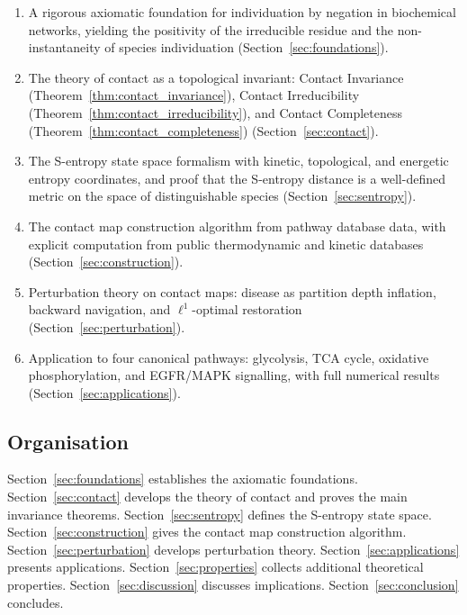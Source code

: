 \documentclass[11pt,twocolumn]{article}
\theoremstyle{plain}
\theoremstyle{definition}
\begin{document}
\begin{enumerate}[label=(\roman*)]
\item A rigorous axiomatic foundation for individuation by negation in
  biochemical networks, yielding the positivity of the irreducible residue
  and the non-instantaneity of species individuation
  (Section~\ref{sec:foundations}).

\item The theory of contact as a topological invariant: Contact Invariance
  (Theorem~\ref{thm:contact_invariance}), Contact Irreducibility
  (Theorem~\ref{thm:contact_irreducibility}), and Contact Completeness
  (Theorem~\ref{thm:contact_completeness}) (Section~\ref{sec:contact}).

\item The S-entropy state space formalism with kinetic, topological, and
  energetic entropy coordinates, and proof that the S-entropy distance is a
  well-defined metric on the space of distinguishable species
  (Section~\ref{sec:sentropy}).

\item The contact map construction algorithm from pathway database data, with
  explicit computation from public thermodynamic and kinetic databases
  (Section~\ref{sec:construction}).

\item Perturbation theory on contact maps: disease as partition depth inflation,
  backward navigation, and $\ell^1$-optimal restoration
  (Section~\ref{sec:perturbation}).

\item Application to four canonical pathways: glycolysis, TCA cycle, oxidative
  phosphorylation, and EGFR/MAPK signalling, with full numerical results
  (Section~\ref{sec:applications}).
\end{enumerate}

\subsection{Organisation}

Section~\ref{sec:foundations} establishes the axiomatic foundations.
Section~\ref{sec:contact} develops the theory of contact and proves the main
invariance theorems. Section~\ref{sec:sentropy} defines the S-entropy state
space. Section~\ref{sec:construction} gives the contact map construction
algorithm. Section~\ref{sec:perturbation} develops perturbation theory.
Section~\ref{sec:applications} presents applications. Section~\ref{sec:properties}
collects additional theoretical properties. Section~\ref{sec:discussion}
discusses implications. Section~\ref{sec:conclusion} concludes.
\end{document}
